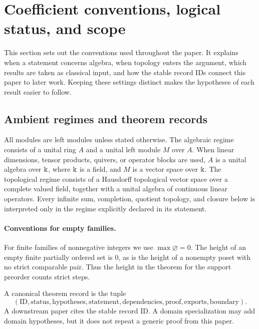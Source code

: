 \section{Coefficient conventions, logical status, and scope}
\begin{readerroadmap}
This section sets out the conventions used throughout the paper.  It explains when a statement concerns algebra, when topology enters the argument, which results are taken as classical input, and how the stable record IDs connect this paper to later work.  Keeping these settings distinct makes the hypotheses of each result easier to follow.
\end{readerroadmap}
\subsection{Ambient regimes and theorem records}

\begin{definition}
\label{def:coefficient-regime}
All modules are left modules unless stated otherwise.  The algebraic regime consists of a unital ring $A$ and a unital left module $M$ over $A$.  When linear dimensions, tensor products, quivers, or operator blocks are used, $A$ is a unital algebra over $\Bbbk$, where $\Bbbk$ is a field, and $M$ is a vector space over $\Bbbk$.  The topological regime consists of a Hausdorff topological vector space over a complete valued field, together with a unital algebra of continuous linear operators.  Every infinite sum, completion, quotient topology, and closure below is interpreted only in the regime explicitly declared in its statement.
\end{definition}
\paragraph{Conventions for empty families.} For finite families of nonnegative integers we use $\max\varnothing=0$. The height of an empty finite partially ordered set is $0$, as is the height of a nonempty poset with no strict comparable pair. Thus the height in the theorem for the support preorder counts strict steps.

\begin{definition}
\label{def:theorem-record}
A canonical theorem record is the tuple
\[
(\mathrm{ID},\mathrm{status},\mathrm{hypotheses},\mathrm{statement},
\mathrm{dependencies},\mathrm{proof},\mathrm{exports},\mathrm{boundary}).
\]
A downstream paper cites the stable record ID.  A domain specialization may add domain hypotheses, but it does not repeat a generic proof from this paper.
\end{definition}

